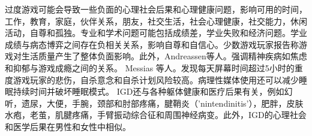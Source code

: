 过度游戏可能会导致一些负面的心理社会后果和心理健康问题，影响可用的时间，工作，教育，家庭，伙伴关系，朋友，社交生活，社会心理健康，社交能力，休闲活动，自尊和孤独。专业和学术问题可能包括成绩差，学业失败和经济问题。学业成绩与病态博弈之间存在负相关关系，影响自尊和自信心。少数游戏玩家报告称游戏对生活质量产生了整体负面影响。此外，Andreassen等人。强调精神疾病如焦虑和抑郁与游戏成瘾之间的关系。 Messias 等人。发现每天屏幕时间超过5小时的重度游戏玩家的悲伤，自杀意念和自杀计划风险较高。病理性媒体使用还可以减少睡眠持续时间并破坏睡眠模式。 IGD还与各种躯体健康和医疗后果有关，例如幻听，遗尿，大便，手腕，颈部和肘部疼痛，腱鞘炎（'nintendinitis'），肥胖，皮肤水疱，老茧，肌腱疼痛，手臂振动综合征和周围神经病变。此外，IGD的心理社会和医学后果在男性和女性中相似。




